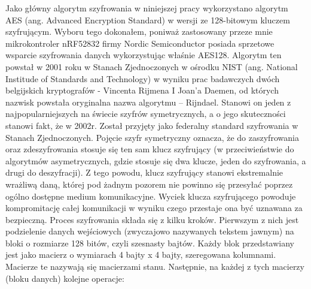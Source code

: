 Jako główny algorytm szyfrowania w niniejszej pracy wykorzystano algorytm AES (ang. Advanced Encryption Standard) w wersji ze 128-bitowym kluczem szyfrującym.  Wyboru tego dokonałem, poniważ zastosowany przeze mnie mikrokontroler nRF52832 firmy Nordic Semiconductor posiada sprzetowe wsparcie szyfrowania danych wykorzystując właśnie AES128. Algorytm ten powstał w 2001 roku w Stanach Zjednoczonych w ośrodku NIST (ang. National Institude of Standards and Technology) w wyniku prac badawczych dwóch belgijskich kryptografów - Vincenta Rijmena I Joan’a Daemen, od których nazwisk powstała oryginalna nazwa algorytmu – Rijndael. Stanowi on jeden z najpopularniejszych na świecie szyfrów symetrycznych, a o jego skuteczności stanowi fakt, że w 2002r. Został przyjęty jako federalny standard szyfrowania w Stanach Zjednoczonych. Pojęcie szyfr symetryczny oznacza, że do zaszyfrowania oraz zdeszyfrowania stosuje się ten sam klucz szyfrujący (w przeciwieństwie do algorytmów asymetrycznych, gdzie stosuje się dwa klucze, jeden do szyfrowania, a drugi do deszyfracji). Z tego powodu, klucz szyfrujący stanowi ekstremalnie wrażliwą daną, której pod żadnym pozorem nie powinno się przesyłać poprzez ogólno dostępne medium komunikacyjne. Wyciek klucza szyfrującego powoduje kompromitację całej komunikacji w wyniku czego przestaje ona być uznawana za bezpieczną.
Proces szyfrowania składa się z kilku kroków. Pierwszym z nich jest podzielenie danych wejściowych (zwyczajowo nazywanych tekstem jawnym) na bloki o rozmiarze 128 bitów, czyli szesnasty bajtów. Każdy blok przedstawiany jest jako macierz o wymiarach 4 bajty x 4 bajty, szeregowana kolumnami. Macierze te nazywają się macierzami stanu. Następnie, na każdej z tych macierzy (bloku danych) kolejne operacje:

